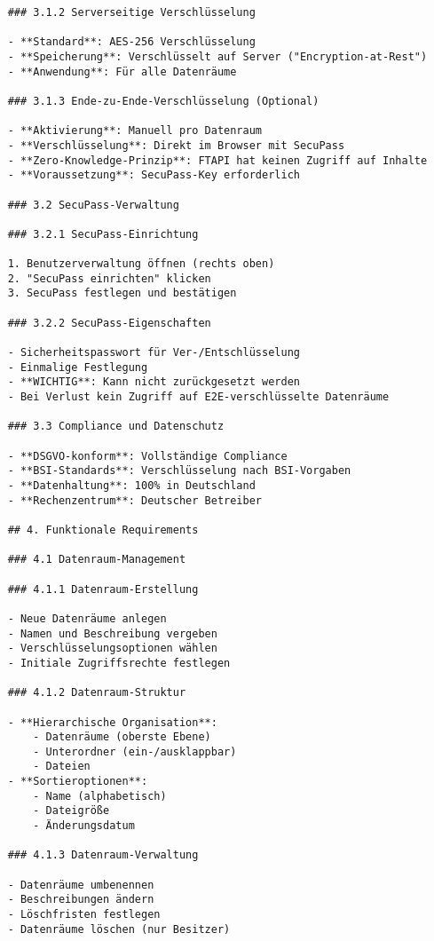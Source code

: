 \begin{verbatim}
    ### 3.1.2 Serverseitige Verschlüsselung
    
    - **Standard**: AES-256 Verschlüsselung
    - **Speicherung**: Verschlüsselt auf Server ("Encryption-at-Rest")
    - **Anwendung**: Für alle Datenräume
    
    ### 3.1.3 Ende-zu-Ende-Verschlüsselung (Optional)
    
    - **Aktivierung**: Manuell pro Datenraum
    - **Verschlüsselung**: Direkt im Browser mit SecuPass
    - **Zero-Knowledge-Prinzip**: FTAPI hat keinen Zugriff auf Inhalte
    - **Voraussetzung**: SecuPass-Key erforderlich
    
    ### 3.2 SecuPass-Verwaltung
    
    ### 3.2.1 SecuPass-Einrichtung
    
    1. Benutzerverwaltung öffnen (rechts oben)
    2. "SecuPass einrichten" klicken
    3. SecuPass festlegen und bestätigen
    
    ### 3.2.2 SecuPass-Eigenschaften
    
    - Sicherheitspasswort für Ver-/Entschlüsselung
    - Einmalige Festlegung
    - **WICHTIG**: Kann nicht zurückgesetzt werden
    - Bei Verlust kein Zugriff auf E2E-verschlüsselte Datenräume
    
    ### 3.3 Compliance und Datenschutz
    
    - **DSGVO-konform**: Vollständige Compliance
    - **BSI-Standards**: Verschlüsselung nach BSI-Vorgaben
    - **Datenhaltung**: 100% in Deutschland
    - **Rechenzentrum**: Deutscher Betreiber
    
    ## 4. Funktionale Requirements
    
    ### 4.1 Datenraum-Management
    
    ### 4.1.1 Datenraum-Erstellung
    
    - Neue Datenräume anlegen
    - Namen und Beschreibung vergeben
    - Verschlüsselungsoptionen wählen
    - Initiale Zugriffsrechte festlegen
    
    ### 4.1.2 Datenraum-Struktur
    
    - **Hierarchische Organisation**:
        - Datenräume (oberste Ebene)
        - Unterordner (ein-/ausklappbar)
        - Dateien
    - **Sortieroptionen**:
        - Name (alphabetisch)
        - Dateigröße
        - Änderungsdatum
    
    ### 4.1.3 Datenraum-Verwaltung
    
    - Datenräume umbenennen
    - Beschreibungen ändern
    - Löschfristen festlegen
    - Datenräume löschen (nur Besitzer)
    

\end{verbatim}
